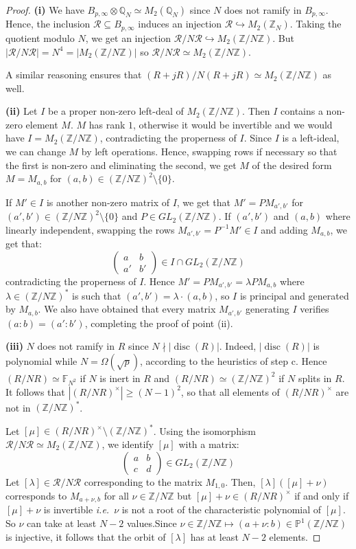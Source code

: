 \documentclass[a4paper,10pt]{report}
\theoremstyle{definition}
\theoremstyle{plain}
\theoremstyle{definition}
\newcommand{\ie}{\emph{i.e.}\ }
\newcommand{\Z}{\mathbb{Z}}
\newcommand{\Q}{\mathbb{Q}}
\newcommand{\F}{\mathbb{F}}
\newcommand{\m}[1]{\mathcal{#1}}
\renewcommand{\(}{\left(}
\renewcommand{\)}{\right)}
\renewcommand{\P}{\mathbb{P}}
\DeclareMathOperator{\disc}{disc}
\begin{document}
\begin{proof}
\textbf{(i)} We have $B_{p,\infty}\otimes\Q_N\simeq M_2(\Q_N)$ since $N$ does not ramify in $B_{p,\infty}$.  Hence, the inclusion $\m{R}\subseteq B_{p,\infty}$ induces an injection $\m{R}\hookrightarrow M_2(\Z_N)$. Taking the quotient modulo $N$, we get an injection $\m{R}/N\m{R}\hookrightarrow M_2(\Z/N\Z)$. But $|\m{R}/N\m{R}|=N^4=|M_2(\Z/N\Z)|$ so $\m{R}/N\m{R}\simeq M_2(\Z/N\Z)$.

A similar reasoning ensures that $(R+jR)/N(R+jR) \simeq M_2(\Z/N\Z)$ as well.

\textbf{(ii)} Let $I$ be a proper non-zero left-deal of $M_2(\Z/N\Z)$. Then $I$ contains a non-zero element $M$. $M$ has rank $1$, otherwise it would be invertible and we would have $I=M_2(\Z/N\Z)$, contradicting the properness of $I$. Since $I$ is a left-ideal, we can change $M$ by left operations. Hence, swapping rows if necessary so that the first is non-zero and eliminating the second, we get $M$ of the desired form $M=M_{a,b}$ for $(a,b)\in(\Z/N\Z)^2\setminus\{0\}$.

If $M'\in I$ is another non-zero matrix of $I$, we get that $M'=PM_{a',b'}$ for $(a',b')\in(\Z/N\Z)^2\setminus\{0\}$ and $P\in GL_2(\Z/N\Z)$. If $(a',b')$ and $(a,b)$ where linearly independent, swapping the rows $M_{a',b'}=P^{-1}M'\in I$ and adding $M_{a,b}$, we get that:
\[\(\begin{array}{cc}
a& b\\
a'& b'
\end{array}\)\in I\cap GL_2(\Z/N\Z)\]
contradicting the properness of $I$. Hence  $M'=PM_{a',b'}=\lambda PM_{a,b}$ where $\lambda\in(\Z/N\Z)^*$ is such that $(a',b')=\lambda\cdot(a,b)$, so $I$ is principal and generated by $M_{a,b}$. We also have obtained that every matrix $M_{a',b'}$ generating $I$ verifies $(a:b)=(a':b')$, completing the proof of point (ii).

\textbf{(iii)} $N$ does not ramify in $R$ since $N\nmid |\disc(R)|$. Indeed, $|\disc(R)|$ is polynomial while $N=\Omega(\sqrt{p})$, according to the heuristics of step c. Hence $(R/NR)\simeq\F_{N^2}$ if $N$ is inert in $R$ and $(R/NR)\simeq(\Z/N\Z)^2$ if $N$ splits in $R$. It follows that $|(R/NR)^\times|\geq (N-1)^2$, so that all elements of $(R/NR)^\times$ are not in $(\Z/N\Z)^*$. 

Let $[\mu]\in (R/NR)^\times\setminus(\Z/N\Z)^*$.  Using the isomorphism $\m{R}/N\m{R}\simeq M_2(\Z/N\Z)$, we identify $[\mu]$ with a matrix:
\[\(\begin{array}{cc}
a & b\\
c & d
\end{array}\)\in GL_2(\Z/N\Z)\]
Let $[\lambda]\in\m{R}/N\m{R}$ corresponding to the matrix $M_{1,0}$. Then, $[\lambda]([\mu]+\nu)$ corresponds to $M_{a+\nu,b}$ for all $\nu\in\Z/N\Z$ but $[\mu]+\nu\in (R/NR)^\times$ if and only if $[\mu]+\nu$ is invertible \ie $\nu$ is not a root of the characteristic polynomial of $[\mu]$. So $\nu$ can take at least $N-2$ values.Since $\nu\in \Z/N\Z\longmapsto (a+\nu:b)\in\P^1(\Z/N\Z)$ is injective, it follows that the orbit of $[\lambda]$ has at least $N-2$ elements.
\end{proof}
\end{document}

